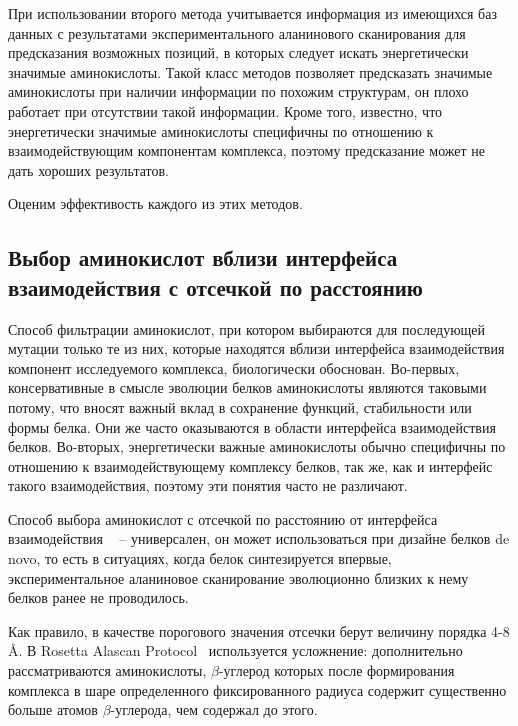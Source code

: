 При использовании второго метода учитывается информация из имеющихся баз данных с результатами экспериментального аланинового сканирования для предсказания возможных позиций, в которых следует искать энергетически значимые аминокислоты. Такой класс методов позволяет предсказать значимые аминокислоты при наличии информации по похожим структурам, он плохо работает при отсутствии такой информации. Кроме того, известно, что энергетически значимые аминокислоты специфичны по отношению к взаимодействующим компонентам комплекса, поэтому предсказание может не дать хороших результатов.

Оценим эффективость каждого из этих методов.

\subsection{Выбор аминокислот вблизи интерфейса взаимодействия с отсечкой по расстоянию}

Способ фильтрации аминокислот, при котором выбираются для последующей мутации только те из них, которые находятся вблизи интерфейса взаимодействия компонент исследуемого комплекса, биологически обоснован. Во-первых,  консервативные в смысле эволюции белков аминокислоты являются таковыми потому, что вносят важный вклад в сохранение функций, стабильности или формы белка. Они же часто оказываются в области интерфейса взаимодействия белков. Во-вторых, энергетически важные аминокислоты обычно специфичны по отношению к взаимодействующему комплексу белков, так же, как и интерфейс такого взаимодействия, поэтому эти понятия часто не различают.

Способ выбора аминокислот с  отсечкой по расстоянию от интерфейса взаимодействия ~\cite{kortemme2004} -- универсален, он может использоваться при дизайне белков de novo, то есть в ситуациях, когда белок синтезируется впервые, экспериментальное аланиновое сканирование эволюционно близких к нему белков ранее не проводилось. 

Как правило, в качестве порогового значения отсечки берут величину порядка  4-8 \AA{}. В  Rosetta Alascan Protocol~\cite{kortemme2004} используется усложнение: дополнительно рассматриваются аминокислоты, $\beta$-углерод которых после формирования комплекса в шаре определенного фиксированного радиуса содержит существенно больше атомов $\beta$-углерода, чем содержал до этого.
